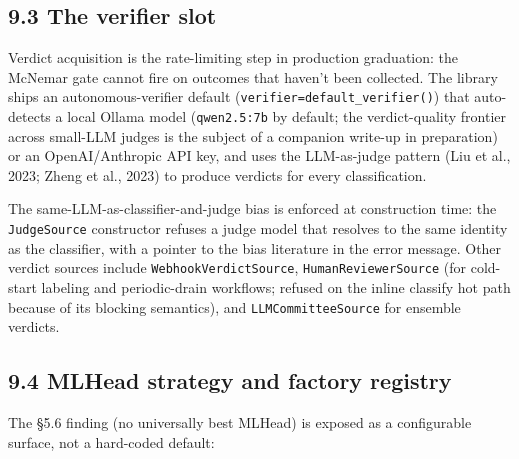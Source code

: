\subsection{9.3 The verifier slot}\label{the-verifier-slot}

Verdict acquisition is the rate-limiting step in production graduation:
the McNemar gate cannot fire on outcomes that haven't been collected.
The library ships an autonomous-verifier default
(\texttt{verifier=default\_verifier()}) that auto-detects a local Ollama
model (\texttt{qwen2.5:7b} by default; the verdict-quality frontier
across small-LLM judges is the subject of a companion write-up in
preparation) or an OpenAI/Anthropic API key, and uses the LLM-as-judge
pattern (Liu et al., 2023; Zheng et al., 2023) to produce verdicts for
every classification.

The same-LLM-as-classifier-and-judge bias is enforced at construction
time: the \texttt{JudgeSource} constructor refuses a judge model that
resolves to the same identity as the classifier, with a pointer to the
bias literature in the error message. Other verdict sources include
\texttt{WebhookVerdictSource}, \texttt{HumanReviewerSource} (for
cold-start labeling and periodic-drain workflows; refused on the inline
classify hot path because of its blocking semantics), and
\texttt{LLMCommitteeSource} for ensemble verdicts.

\subsection{9.4 MLHead strategy and factory
registry}\label{mlhead-strategy-and-factory-registry}

The §5.6 finding (no universally best MLHead) is exposed as a
configurable surface, not a hard-coded default:

